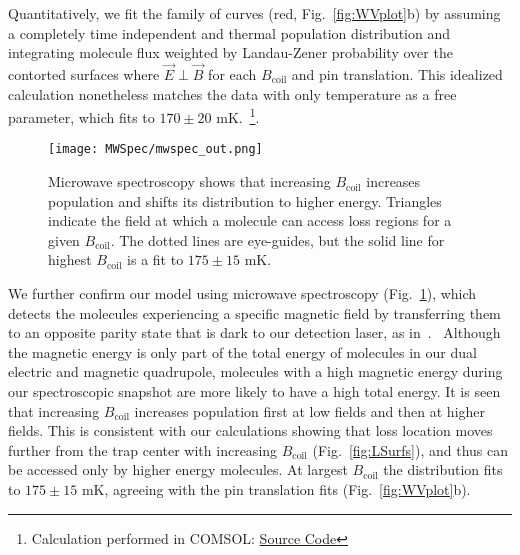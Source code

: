 \documentclass[%
 reprint,
 amsmath,amssymb,
 aps,
prl,
]{revtex4-1}
\newcommand{\bcl}{{$B_\text{coil}$}}
\newcommand{\epb}{{$\vec{E}\!\perp\!\vec{B}$}}
\newcommand{\cmnt}[1]{\ignorespaces}
\begin{document}
Quantitatively, we fit the family of curves (red, Fig.~\ref{fig:WVplot}b) by assuming a completely time independent and thermal population distribution and integrating molecule flux weighted by Landau-Zener probability over the contorted surfaces where \epb{} for each \bcl{} and pin translation.
This idealized calculation nonetheless matches the data with only temperature as a free parameter, which fits to $170\pm20\text{ mK}$.~\footnote{Calculation performed in COMSOL: \href{https://github.com/dreens/spin-flip-integration/}{Source Code}}.
\cmnt{The asymmetry of the curves about $B_\text{coil}=0$ comes from a slight shift of the electric quadrupole field caused by an intentional bending of the last pin pair. This bend enhances laser induced fluorescence collection, our detection technique.}

\begin{figure}[tb]
\texttt{[image: MWSpec/mwspec\_out.png]}%
\caption{
Microwave spectroscopy shows that increasing \bcl{} increases population and shifts its distribution to higher energy. Triangles indicate the field at which a molecule can access loss regions for a given \bcl. The dotted lines are eye-guides, but the solid line for highest \bcl{} is a fit to $175\pm15\text{ mK}$.
\label{fig:spec}}
\end{figure}

We further confirm our model using microwave spectroscopy (Fig.~\ref{fig:spec}), which detects the molecules experiencing a specific magnetic field by transferring them to an opposite parity state that is dark to our detection laser, as in~\cite{Stuhl2012evap}.\cmnt{, except here we turn off the electric trapping field just before the spectroscopy, which happens before any significant molecular motion. \cmnt{but with a microwave probe directly exciting free space modes of our vacuum chamber\cmnt{instead of a bias tee}.}}  ~Although the magnetic energy is only part of the total energy of molecules in our dual electric and magnetic quadrupole, molecules with a high magnetic energy during our spectroscopic snapshot are more likely to have a high total energy. It is seen that increasing \bcl{} increases population first at low fields and then at higher fields. This is consistent with our calculations showing that loss location moves further from the trap center with increasing \bcl{} (Fig.~\ref{fig:LSurfs}), and thus can be accessed only by higher energy molecules. At largest \bcl{} the distribution fits to $175\pm15\text{ mK}$, agreeing with the pin translation fits (Fig.~\ref{fig:WVplot}b).%
\end{document}
